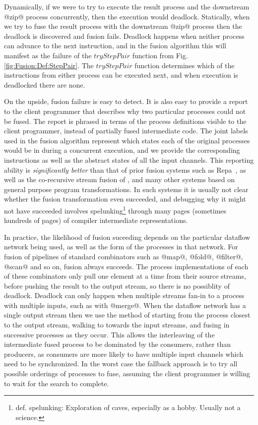 Dynamically, if we were to try to execute the result process and the downstream @zip@ process concurrently, then the execution would deadlock.
Statically, when we try to fuse the result process with the downstream @zip@ process then the deadlock is discovered and fusion fails.
Deadlock happens when neither process can advance to the next instruction, and in the fusion algorithm this will manifest as the failure of the $tryStepPair$ function from Fig.\ref{fig:Fusion:Def:StepPair}.
The $tryStepPair$ function determines which of the instructions from either process can be executed next, and when execution is deadlocked there are none.

On the upside, fusion failure is easy to detect.
It is also easy to provide a report to the client programmer that describes why two particular processes could not be fused.
The report is phrased in terms of the process definitions visible to the client programmer, instead of partially fused intermediate code.
The joint labels used in the fusion algorithm represent which states each of the original processes would be in during a concurrent execution, and we provide the corresponding instructions as well as the abstract states of all the input channels.
This reporting ability is \emph{significantly better} than that of prior fusion systems such as Repa~\cite{lippmeier2012guiding}, as well as the co-recursive stream fusion of \cite{coutts2007stream}, and many other systems based on general purpose program transformations.
In such systems it is usually not clear whether the fusion transformation even succeeded, and debugging why it might not have succeeded involves spelunking\footnote{def. spelunking: Exploration of caves, especially as a hobby. Usually not a science.} through many pages (sometimes hundreds of pages) of compiler intermediate representations.

In practice, the likelihood of fusion suceeding depends on the particular dataflow network being used, as well as the form of the processes in that network.
For fusion of pipelines of standard combinators such as @map@, @fold@, @filter@, @scan@ and so on, fusion always succeeds.
The process implementations of each of these combinators only pull one element at a time from their source streams, before pushing the result to the output stream, so there is no possiblity of deadlock.
Deadlock can only happen when multiple streams fan-in to a process with multiple inputs, such as with @merge@.
When the dataflow network has a single output stream then we use the method of starting from the process closest to the output stream, walking to towards the input streams, and fusing in successive processes as they occur.
This allows the interleaving of the intermediate fused process to be dominated by the consumers, rather than producers, as consumers are more likely to have multiple input channels which need to be synchronized.
In the worst case the fallback approach is to try all possible orderings of processes to fuse, assuming the client programmer is willing to wait for the search to complete. 


